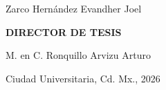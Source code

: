 \begin{titlepage}
\begin{minipage}[c][0.98\textheight][s]{\dimexpr\textwidth -6 cm\relax}
  \vspace{0.5cm}

  {\normalsize Zarco Hernández Evandher Joel}

\vspace{2.5cm}

  {\normalsize\bfseries DIRECTOR DE TESIS}

  \vspace{0.4cm}

  {\normalsize M. en C. Ronquillo Arvizu Arturo}

  \vfill

  \begin{flushright}
    {\small Ciudad Universitaria, Cd. Mx., 2026}
  \end{flushright}

\end{minipage}

\end{titlepage}
\restoregeometry

